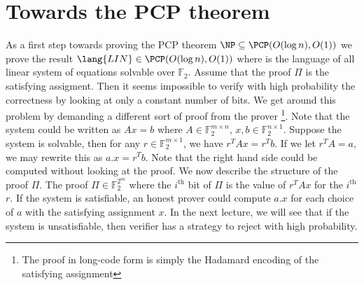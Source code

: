 \section{Towards the PCP theorem}
As a first step towards proving the PCP theorem $\NP \subseteq \PCP(O(\log n), O(1))$ we prove the result 
$\lang{LIN} \in \PCP(O(\log n), O(1))$ where  is the language of all linear system of equations 
solvable over $\mathbb{F}_2$. Assume that the proof $\Pi$ is the satisfying assigment. Then it seems impossible 
to verify with high probability the correctness by looking at only a constant number of bits. We get around 
this problem by demanding a different sort of proof from the prover \footnote{The proof in long-code form is simply the 
Hadamard encoding of the satisfying assignment}. Note that the system could be written as 
$Ax = b$ where $A \in \mathbb{F}_{2}^{m \times n}$, $x, b \in \mathbb{F}_{2}^{n \times 1}$. Suppose the 
system is solvable, then for any $r \in \mathbb{F}_{2}^{m \times 1}$, we have $r^{T}Ax = r^{T}b$. If we 
let $r^{T}A = a$, we may rewrite this as $a.x = r^{T}b$. Note that the right hand side could be computed 
without looking at the proof. We now describe the structure of the proof $\Pi$. 
The proof $\Pi \in \mathbb{F}_{2}^{2^m}$ where the $i^{\textrm{th}}$ bit of $\Pi$ is the value 
of $r^{T}Ax$ for the $i^{\textrm{th}}$ $r$. If the system is satisfiable, an honest prover could compute $a.x$ for 
each choice of $a$ with the satisfying assignment $x$. In the next lecture, we will see that if the system is 
unsatisfiable, then verifier has a strategy to reject with high probability.

